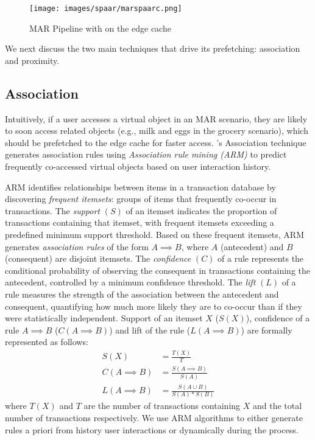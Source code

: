         \begin{figure}[t]
            \centering
            \texttt{[image: images/spaar/marspaarc.png]}
            \caption{MAR Pipeline with \spaarc{} on the edge cache}
            \label{fig:marspaarc}
            \vspace{-5mm}
        \end{figure}

        We next discuss the two main \spaarc{} techniques that drive its prefetching:  association and proximity.
        
        \subsection{Association}
        \label{ssec:spaarc_assoc}
        Intuitively, if a user accesses a virtual object in an MAR scenario, they are likely to soon access related objects (e.g., milk and eggs in the grocery scenario), which should be prefetched to the edge cache for faster access. \spaarc's Association technique generates association rules using {\em Association rule mining (ARM)} \cite{bib:armorig, bib:arm} to predict frequently co-accessed virtual objects based on user interaction history. 
        
        ARM identifies relationships between items in a transaction database by discovering {\em frequent itemsets}: groups of items that frequently co-occur in transactions. The {\em support} $(S)$ of an itemset indicates the proportion of transactions containing that itemset, with frequent itemsets exceeding a predefined minimum support threshold. Based on these frequent itemsets, ARM generates {\em association rules} of the form  $A \implies B$, where $A$ (antecedent) and $B$ (consequent) are disjoint itemsets. The {\em confidence} $(C)$ of a rule represents the conditional probability of observing the consequent in transactions containing the antecedent, controlled by a minimum confidence threshold.  The {\em lift} $(L)$ of a rule measures the strength of the association between the antecedent and consequent, quantifying how much more likely they are to co-occur than if they were statistically independent. Support of an itemset $X$ ($S(X)$), confidence of a rule $A \implies B$ ($C(A \implies B)$) and lift of the rule ($L(A \implies B)$) are formally represented as follows:
            \begin{align}
                S(X) & = \frac{T(X)}{T} \\
                C(A \implies B) & = \frac{S(A \implies B)}{S(A)}\\
                L(A \implies B) &= \frac{S(A \cup B)}{S(A) * S(B)}
            \end{align}
            where $T(X)$ and $T$ are the number of transactions containing $X$ and the total number of transactions respectively. We use ARM algorithms to either generate rules a priori from history user interactions or dynamically during the process.

